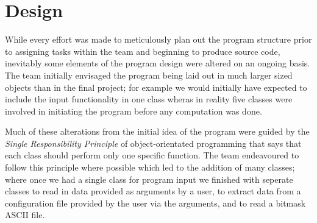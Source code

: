 \section{Design}
\label{Design}
While every effort was made to meticulously plan out the program structure prior to assigning tasks within the team and beginning to produce source code, inevitably some elements of the program design were altered on an ongoing basis. The team initially envisaged the program being laid out in much larger sized objects than in the final project; for example we would initially have expected to include the input functionality in one class wheras in reality five classes were involved in initiating the program before any computation was done. 

Much of these alterations from the initial idea of the program were guided by the \textit{Single Responsibility Principle} of object-orientated programming that says that each class should perform only one specific function. The team endeavoured to follow this principle where possible which led to the addition of many classes; where once we had a single class for program input we finished with seperate classes to read in data provided as arguments by a user, to extract data from a configuration file provided by the user via the arguments, and to read a bitmask ASCII file.

